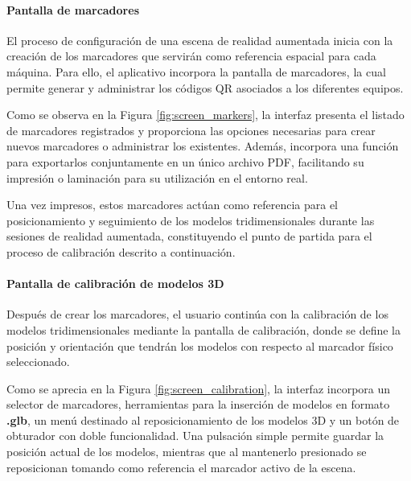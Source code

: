             \paragraph{Pantalla de marcadores}

                El proceso de configuración de una escena de realidad aumentada inicia con la creación de los marcadores que servirán como referencia espacial para cada máquina. Para ello, el aplicativo incorpora la pantalla de marcadores, la cual permite generar y administrar los códigos QR asociados a los diferentes equipos.

                

                Como se observa en la Figura \ref{fig:screen_markers}, la interfaz presenta el listado de marcadores registrados y proporciona las opciones necesarias para crear nuevos marcadores o administrar los existentes. Además, incorpora una función para exportarlos conjuntamente en un único archivo PDF, facilitando su impresión o laminación para su utilización en el entorno real.

                Una vez impresos, estos marcadores actúan como referencia para el posicionamiento y seguimiento de los modelos tridimensionales durante las sesiones de realidad aumentada, constituyendo el punto de partida para el proceso de calibración descrito a continuación.

            \paragraph{Pantalla de calibración de modelos 3D}

                Después de crear los marcadores, el usuario continúa con la calibración de los modelos tridimensionales mediante la pantalla de calibración, donde se define la posición y orientación que tendrán los modelos con respecto al marcador físico seleccionado.

                

                Como se aprecia en la Figura \ref{fig:screen_calibration}, la interfaz incorpora un selector de marcadores, herramientas para la inserción de modelos en formato \textbf{.glb}, un menú destinado al reposicionamiento de los modelos 3D y un botón de obturador con doble funcionalidad. Una pulsación simple permite guardar la posición actual de los modelos, mientras que al mantenerlo presionado se reposicionan tomando como referencia el marcador activo de la escena.

